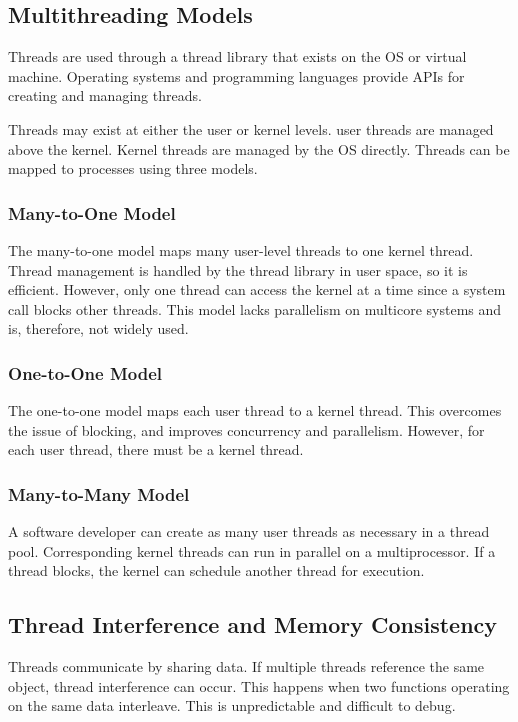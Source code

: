 \subsection{Multithreading Models}

Threads are used through a thread library that exists on the OS or virtual machine.
Operating systems and programming languages provide APIs for creating and managing threads.

Threads may exist at either the user or kernel levels.
user threads are managed above the kernel.
Kernel threads are managed by the OS directly.
Threads can be mapped to processes using three models.

\subsubsection{Many-to-One Model}

The many-to-one model maps many user-level threads to one kernel thread.
Thread management is handled by the thread library in user space, so it is efficient.
However, only one thread can access the kernel at a time since a system call blocks other threads.
This model lacks parallelism on multicore systems and is, therefore, not widely used.

\subsubsection{One-to-One Model}

The one-to-one model maps each user thread to a kernel thread.
This overcomes the issue of blocking, and improves concurrency and parallelism.
However, for each user thread, there must be a kernel thread.

\subsubsection{Many-to-Many Model}

A software developer can create as many user threads as necessary in a thread pool.
Corresponding kernel threads can run in parallel on a multiprocessor.
If a thread blocks, the kernel can schedule another thread for execution.

\subsection{Thread Interference and Memory Consistency}

Threads communicate by sharing data.
If multiple threads reference the same object, thread interference can occur.
This happens when two functions operating on the same data interleave.
This is unpredictable and difficult to debug.

